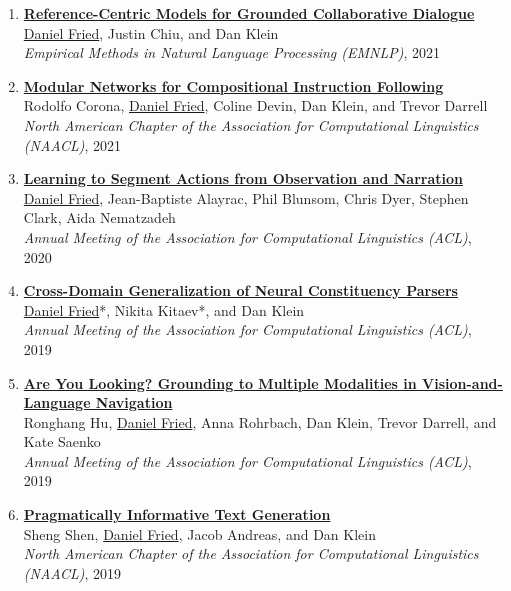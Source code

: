 \begin{enumerate}[leftmargin=-1mm,partopsep=0pt]
\item \href{https://arxiv.org/abs/2109.05042}{\textbf{Reference-Centric Models for Grounded Collaborative Dialogue}} \\
  \underline{Daniel Fried}, Justin Chiu, and Dan Klein\\
  \emph{Empirical Methods in Natural Language Processing (EMNLP)}, 2021

\item \href{https://arxiv.org/abs/2010.12764}{\textbf{Modular Networks for Compositional Instruction Following}} \\
  Rodolfo Corona, \underline{Daniel Fried}, Coline Devin, Dan Klein, and Trevor Darrell\\
  \emph{North American Chapter of the Association for Computational Linguistics (NAACL)}, 2021

\item \href{https://arxiv.org/abs/2005.03684}{\textbf{Learning to Segment Actions from Observation and Narration}} \\
  \underline{Daniel Fried}, Jean-Baptiste Alayrac, Phil Blunsom, Chris Dyer, Stephen Clark, Aida Nematzadeh\\
  \emph{Annual Meeting of the Association for Computational Linguistics (ACL)}, 2020

\item \href{https://arxiv.org/abs/1907.04347}{\textbf{Cross-Domain Generalization of Neural Constituency Parsers}} \\
  \underline{Daniel Fried}*, Nikita Kitaev*, and Dan Klein\\
  \emph{Annual Meeting of the Association for Computational Linguistics (ACL)}, 2019

\item \href{https://arxiv.org/abs/1906.00347}{\textbf{Are You Looking? Grounding to Multiple Modalities in Vision-and-Language Navigation}} \\
  Ronghang Hu, \underline{Daniel Fried}, Anna Rohrbach, Dan Klein, Trevor Darrell, and Kate Saenko\\
  \emph{Annual Meeting of the Association for Computational Linguistics (ACL)}, 2019

\item \href{https://arxiv.org/abs/1904.01301}{\textbf{Pragmatically Informative Text Generation}} \\
  Sheng Shen, \underline{Daniel Fried}, Jacob Andreas, and Dan Klein\\
  \emph{North American Chapter of the Association for Computational Linguistics (NAACL)}, 2019


\end{enumerate}
